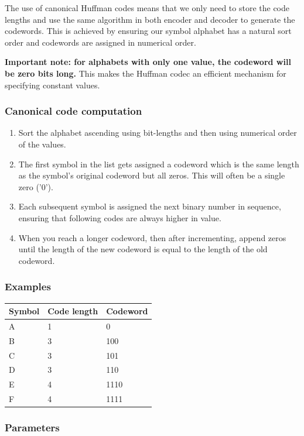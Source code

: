 \documentclass[a4paper]{article}
\begin{document}
The use of canonical Huffman codes means that we only need to store the code lengths and use the same algorithm in both encoder and decoder to generate the codewords.
This is achieved by ensuring our symbol alphabet has a natural sort order and codewords are assigned in numerical order.

\textbf{Important note: for alphabets with only one value, the codeword will be zero bits long.}
This makes the Huffman codec an efficient mechanism for specifying constant values.

\subsubsection*{Canonical code computation}

\begin{enumerate}
\item Sort the alphabet ascending using bit-lengths and then using numerical order 
of the values.

\item The first symbol in the list gets assigned a codeword which is the same length 
as the symbol's original codeword but all zeros. This will often be a single zero 
('0').

\item Each subsequent symbol is assigned the next binary number in sequence, ensuring
that following codes are always higher in value.

\item When you reach a longer codeword, then after incrementing, append zeros until 
the length of the new codeword is equal to the length of the old codeword.
\end{enumerate}

\subsubsection*{Examples}

\begin{tabular}{|>{\raggedright}p{105pt}|>{\raggedright}p{105pt}|>{\raggedright}p{105pt}|}
\hline
\textbf{Symbol} & \textbf{Code length} & \textbf{Codeword}\tabularnewline
\hline
A & 1 & 0\tabularnewline
\hline
B & 3 & 100\tabularnewline
C & 3 & 101\tabularnewline
D & 3 & 110\tabularnewline
\hline
E & 4 & 1110\tabularnewline
F & 4 & 1111\tabularnewline
\hline
\end{tabular}

\subsubsection*{Parameters}
\end{document}
